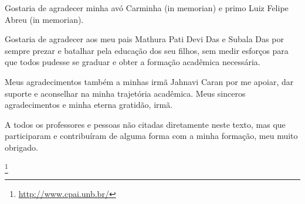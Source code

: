 \begin{agradecimentos}
	Gostaria de agradecer minha avó Carminha (in memorian) e primo Luiz Felipe Abreu (in memorian).

			Gostaria de agradecer aos meu pais Mathura Pati Devi Das e Subala Das por sempre prezar e batalhar pela educação dos seu filhos, sem medir esforços para que todos pudesse se graduar e obter a formação acadêmica necessária.

			Meus agradecimentos também a minhas irmã Jahnavi Caran por me apoiar, dar suporte e aconselhar na minha trajetória acadêmica. Meus sinceros agradecimentos e minha eterna gratidão, irmã.


			A todos os professores e pessoas não citadas diretamente neste texto, mas que participaram e contribuíram de alguma forma com a minha formação, meu muito obrigado.



\footnote{\url{http://www.cpai.unb.br/}}

\end{agradecimentos}
